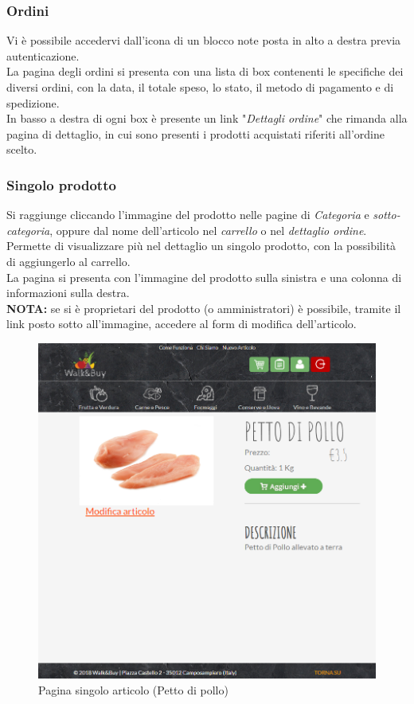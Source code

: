 	\subsubsection{Ordini}
	Vi è possibile accedervi dall'icona di un blocco note posta in alto a destra previa autenticazione.\\
	La pagina degli ordini si presenta con una lista di box contenenti le specifiche dei diversi ordini, con la data, il totale speso, lo stato, il metodo di pagamento e di spedizione.\\
	In basso a destra di ogni box è presente un link "\textit{Dettagli ordine}" che rimanda alla pagina di dettaglio, in cui sono presenti i prodotti acquistati riferiti all'ordine scelto.
	
	\subsubsection{Singolo prodotto}
	Si raggiunge cliccando l'immagine del prodotto nelle pagine di \textit{Categoria} e \textit{sotto-categoria}, oppure dal nome dell'articolo nel \textit{carrello} o nel \textit{dettaglio ordine}.\\ Permette di visualizzare più nel dettaglio un singolo prodotto, con la possibilità di aggiungerlo al carrello.\\
	La pagina si presenta con l'immagine del prodotto sulla sinistra e una colonna di informazioni sulla destra.\\
	\textbf{NOTA:} se si è proprietari del prodotto (o amministratori) è possibile, tramite il link posto sotto all'immagine, accedere al form di modifica dell'articolo.
	\begin{figure}[H]
		\includegraphics[width=\linewidth]{res/img/sing-prod+}
		\caption{Pagina singolo articolo (Petto di pollo)}
		\label{Pagina singolo articolo}
	\end{figure}
	

